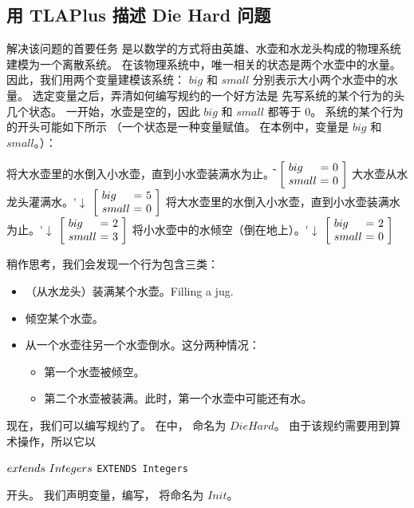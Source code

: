 \begin{ch}
\subsection{用 TLAPlus 描述 Die Hard 问题}%

解决该问题的首要任务
是以数学的方式将由英雄、水壶和水龙头构成的物理系统建模为一个离散系统。
在该物理系统中，唯一相关的状态是两个水壶中的水量。
因此，我们用两个变量建模该系统：
$big$ 和 $small$ 分别表示大小两个水壶中的水量。
选定变量之后，弄清如何编写规约的一个好方法是
先写系统的某个行为的头几个状态。
一开始，水壶是空的，因此 $big$ 和 $small$ 都等于 0。
系统的某个行为的开头可能如下所示
（一个状态是一种变量赋值。
在本例中，变量是 $big$ 和 $small$。）：
\begin{display}
\begin{tabbing}
将大水壶里的水倒入小水壶，直到小水壶装满水为止。\= \kill
%
\>
$\dhstate{0}{0}$
%
\>大水壶从水龙头灌满水。\'$\downarrow$
%
\>
$\dhstate{5}{0}$ 
%
%
\>将大水壶里的水倒入小水壶，直到小水壶装满水为止。\'$\downarrow$
%
\>
$\dhstate{2}{3}$
%
\>将小水壶中的水倾空（倒在地上）。\'$\downarrow$
%
\> $\dhstate{2}{0}$
\end{tabbing}
\end{display}
稍作思考，我们会发现一个行为包含三类\tlastep{}：
\begin{itemize}
\item （从水龙头）装满某个水壶。Filling a jug.
\item 倾空某个水壶。
\item 从一个水壶往另一个水壶倒水。这分两种情况：
\begin{itemize}
\item 第一个水壶被倾空。
\item 第二个水壶被装满。此时，第一个水壶中可能还有水。
\end{itemize}
\end{itemize}
现在，我们可以编写规约了。
在\tlatoolbox{}中，
命名为 $DieHard$。
由于该规约需要用到算术操作，所以它以
\begin{display}
\begin{twocols}%
$\EXTENDS\ Integers$
\midcol
\verb|EXTENDS Integers|
\end{twocols}
\end{display}
开头。
我们声明变量，编写\tlainitpredicate{}，
将\tlainitpredicate{}命名为 $Init$。
\smallskip
\begin{display}

\end{display}
\end{ch}
